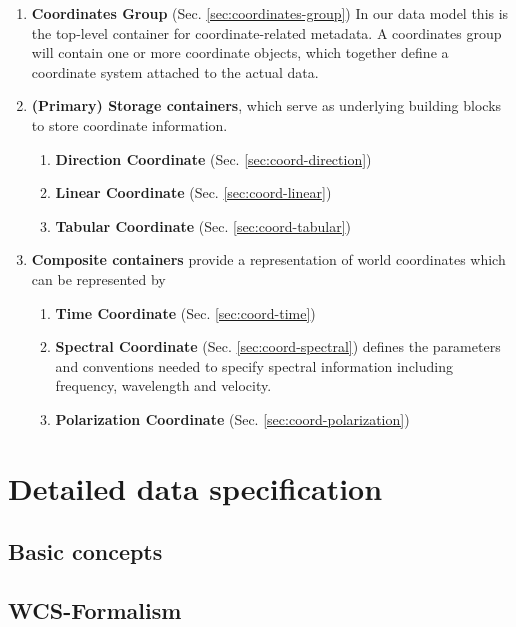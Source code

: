 \documentclass[a4paper,10pt,bibtotoc]{scrreprt}
\begin{document}
\begin{enumerate}
\item \textbf{Coordinates Group} (Sec. \ref{sec:coordinates-group}) In our data
  model this is the top-level container for coordinate-related metadata. A
  coordinates group will contain one or more coordinate objects, which together
  define a coordinate system attached to the actual data.
\item \textbf{(Primary) Storage containers}, which serve as underlying building
  blocks to store coordinate information.
  \begin{enumerate}
  \item \textbf{Direction Coordinate} (Sec. \ref{sec:coord-direction})
  \item \textbf{Linear Coordinate} (Sec. \ref{sec:coord-linear})
  \item \textbf{Tabular Coordinate} (Sec. \ref{sec:coord-tabular})
  \end{enumerate}
\item \textbf{Composite containers} provide a representation of world
  coordinates which can be represented by 
  \begin{enumerate}
  \item \textbf{Time Coordinate} (Sec. \ref{sec:coord-time})
  \item \textbf{Spectral Coordinate} (Sec. \ref{sec:coord-spectral})
    defines the parameters and conventions needed to specify spectral
    information including frequency, wavelength and velocity.
  \item \textbf{Polarization Coordinate} (Sec. \ref{sec:coord-polarization})
  \end{enumerate}
\end{enumerate}


\chapter{Detailed data specification}
\label{sec:data-specification}

\section{Basic concepts}
\label{sec:basic-concepts}

\section{WCS-Formalism}
\label{sec:wcs-formalism}
\end{document}
